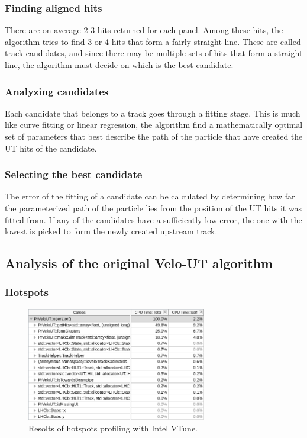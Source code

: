 \documentclass[12pt]{article}
\begin{document}
\subsubsection{Finding aligned hits}

There are on average 2-3 hits returned for each panel. Among these hits, the algorithm tries to find 3 or 4 hits that form a fairly straight line. These are called track candidates, and since there may be multiple sets of hits that form a straight line, the algorithm must decide on which is the best candidate.


\subsubsection{Analyzing candidates}

Each candidate that belongs to a track goes through a fitting stage. This is much like curve fitting or linear regression, the algorithm find a mathematically optimal set of parameters that best describe the path of the particle that have created the UT hits of the candidate. 


\subsubsection{Selecting the best candidate}

The error of the fitting of a candidate can be calculated by determining how far the parameterized path of the particle lies from the position of the UT hits it was fitted from. If any of the candidates have a sufficiently low error, the one with the lowest is picked to form the newly created upstream track.


\subsection{Analysis of the original Velo-UT algorithm}

\subsubsection{Hotspots}

\begin{figure}[H]
	\begin{center}
		\includegraphics[width=0.7\textwidth]{velout_hotspots_orig}
	\end{center}
	\caption{Resolts of hotspots profiling with Intel VTune.}
	\label{fig_velout_hotspots_orig}
\end{figure}
\end{document}
